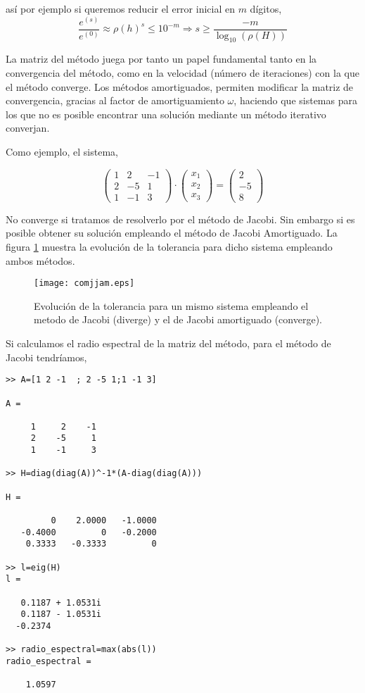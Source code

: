 así por ejemplo si queremos reducir el error inicial en $m$ dígitos,
\begin{equation*}
\frac{e^{(s)}}{e^{(0)}} \approx \rho(h)^s \leq 10^{-m} \Rightarrow s \geq \frac{-m}{\log_{10}\left(\rho(H)\right)}
\end{equation*}

La matriz del método juega por tanto un papel fundamental tanto en la convergencia del método, como en la velocidad (número de iteraciones) con la que el método converge. Los métodos amortiguados, permiten modificar la matriz de convergencia, gracias al factor de amortiguamiento $\omega$, haciendo que sistemas para los que no es posible encontrar una solución mediante un método iterativo converjan.

Como ejemplo, el sistema,

\begin{equation*}
\begin{pmatrix}
1& 2& -1\\
2& -5& 1\\
1& -1& 3
\end{pmatrix}\cdot \begin{pmatrix}
x_1\\
x_2\\
x_3
\end{pmatrix}=\begin{pmatrix}
2\\
-5\\
8
\end{pmatrix}
\end{equation*}

No converge si tratamos de resolverlo por el método de Jacobi. Sin embargo si es posible obtener su solución empleando el método de Jacobi Amortiguado. La figura \ref{fig:cjjam}  muestra la evolución de la tolerancia para dicho sistema empleando ambos métodos.

\begin{figure}[h]
\centering
\texttt{[image: comjjam.eps]}
\caption{Evolución de la tolerancia para un mismo sistema empleando el metodo de Jacobi (diverge) y el de Jacobi amortiguado (converge).}
\label{fig:cjjam}


\end{figure}

Si calculamos el radio espectral de la matriz del método, para el método de Jacobi tendríamos,
\begin{verbatim}
>> A=[1 2 -1  ; 2 -5 1;1 -1 3]

A =

     1     2    -1
     2    -5     1
     1    -1     3

>> H=diag(diag(A))^-1*(A-diag(diag(A)))

H =

         0    2.0000   -1.0000
   -0.4000         0   -0.2000
    0.3333   -0.3333         0

>> l=eig(H)
l =

   0.1187 + 1.0531i
   0.1187 - 1.0531i
  -0.2374          

>> radio_espectral=max(abs(l))
radio_espectral =

    1.0597
\end{verbatim}

